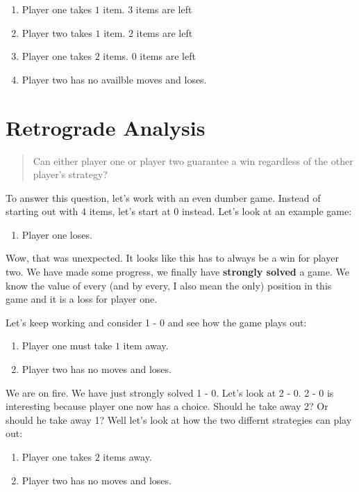 \documentclass[a4paper]{article}
\begin{document}
\begin{enumerate}
    \item{Player one takes $1$ item. $3$ items are left}
    \item{Player two takes $1$ item. $2$ items are left}
    \item{Player one takes $2$ items. $0$ items are left}
    \item{Player two has no availble moves and loses.}
\end{enumerate}

\section{Retrograde Analysis}

\begin{quote}
    Can either player one or player two guarantee a win regardless of the other player's strategy?
\end{quote}

To answer this question, let's work with an even dumber game. Instead of starting out with $4$ items, let's start at $0$ instead. Let's look at an example game:

\begin{enumerate}
    \item{Player one loses.}
\end{enumerate}

Wow, that was unexpected. It looks like this has to always be a win for player two. We have made some progress, we finally have \textbf{strongly solved} a game. We know the value of every (and by every, I also mean the only) position in this game and it is a loss for player one.

Let's keep working and consider 1 - 0 and see how the game plays out:

\begin{enumerate}
    \item{Player one must take $1$ item away.}
    \item{Player two has no moves and loses.}
\end{enumerate}

We are on fire. We have just strongly solved 1 - 0. Let's look at 2 - 0. 2 - 0 is interesting because player one now has a choice. Should he take away 2? Or should he take away 1? Well let's look at how the two differnt strategies can play out:

\begin{enumerate}
    \item{Player one takes $2$ items away.}
    \item{Player two has no moves and loses.}
\end{enumerate}
\end{document}
